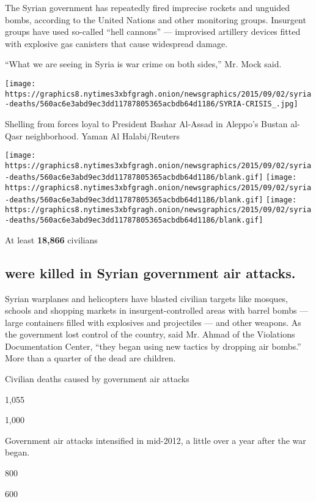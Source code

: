 The Syrian government has repeatedly fired imprecise rockets and
unguided bombs, according to the United Nations and other monitoring
groups. Insurgent groups have used so-called ``hell cannons'' ---
improvised artillery devices fitted with explosive gas canisters that
cause widespread damage.

``What we are seeing in Syria is war crime on both sides,'' Mr. Mock
said.

\texttt{[image: https://graphics8.nytimes3xbfgragh.onion/newsgraphics/2015/09/02/syria-deaths/560ac6e3abd9ec3dd11787805365acbdb64d1186/SYRIA-CRISIS\_.jpg]}

Shelling from forces loyal to President Bashar Al-Assad in Aleppo's
Bustan al-Qasr neighborhood. Yaman Al Halabi/Reuters

\texttt{[image: https://graphics8.nytimes3xbfgragh.onion/newsgraphics/2015/09/02/syria-deaths/560ac6e3abd9ec3dd11787805365acbdb64d1186/blank.gif]}
\texttt{[image: https://graphics8.nytimes3xbfgragh.onion/newsgraphics/2015/09/02/syria-deaths/560ac6e3abd9ec3dd11787805365acbdb64d1186/blank.gif]}
\texttt{[image: https://graphics8.nytimes3xbfgragh.onion/newsgraphics/2015/09/02/syria-deaths/560ac6e3abd9ec3dd11787805365acbdb64d1186/blank.gif]}

At least \textbf{18,866} civilians

\hypertarget{were-killed-in-syrian-government-air-attacks}{%
\subsection{were killed in Syrian government air
attacks.}\label{were-killed-in-syrian-government-air-attacks}}

Syrian warplanes and helicopters have blasted civilian targets like
mosques, schools and shopping markets in insurgent-controlled areas with
barrel bombs --- large containers filled with explosives and projectiles
--- and other weapons. As the government lost control of the country,
said Mr. Ahmad of the Violations Documentation Center, ``they began
using new tactics by dropping air bombs.'' More than a quarter of the
dead are children.

Civilian deaths caused by government air attacks

1,055

1,000

Government air attacks intensified in mid-2012, a little over a year
after the war began.

800

600

